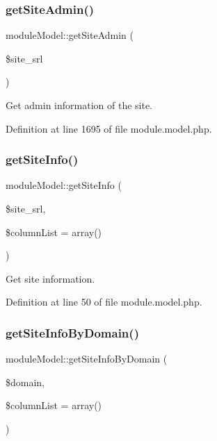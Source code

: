 \subsubsection{\texorpdfstring{get\+Site\+Admin()}{getSiteAdmin()}}
{\footnotesize\ttfamily module\+Model\+::get\+Site\+Admin (\begin{DoxyParamCaption}\item[{}]{\$site\+\_\+srl }\end{DoxyParamCaption})}



Get admin information of the site. 



Definition at line 1695 of file module.\+model.\+php.

\hypertarget{classmoduleModel_a96446e3b8e031ec1264c7187cb1384a5}{}\label{classmoduleModel_a96446e3b8e031ec1264c7187cb1384a5} 
\subsubsection{\texorpdfstring{get\+Site\+Info()}{getSiteInfo()}}
{\footnotesize\ttfamily module\+Model\+::get\+Site\+Info (\begin{DoxyParamCaption}\item[{}]{\$site\+\_\+srl,  }\item[{}]{\$column\+List = {\ttfamily array()} }\end{DoxyParamCaption})}



Get site information. 



Definition at line 50 of file module.\+model.\+php.

\hypertarget{classmoduleModel_a6c4e1496c55c3c15507bb9532cb01c7f}{}\label{classmoduleModel_a6c4e1496c55c3c15507bb9532cb01c7f} 
\subsubsection{\texorpdfstring{get\+Site\+Info\+By\+Domain()}{getSiteInfoByDomain()}}
{\footnotesize\ttfamily module\+Model\+::get\+Site\+Info\+By\+Domain (\begin{DoxyParamCaption}\item[{}]{\$domain,  }\item[{}]{\$column\+List = {\ttfamily array()} }\end{DoxyParamCaption})}



